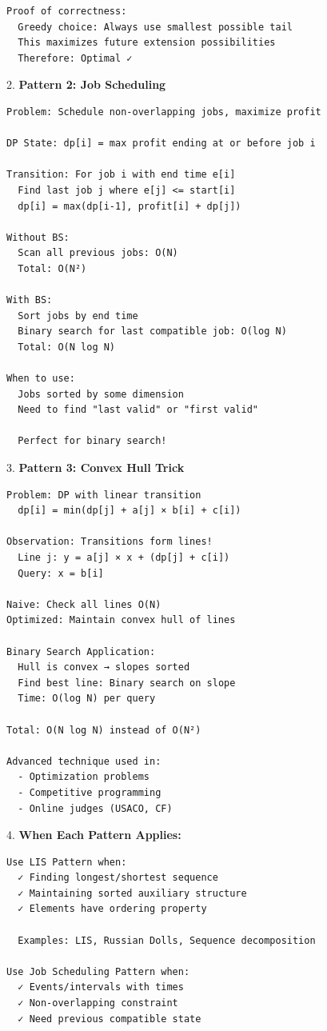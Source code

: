 \documentclass[11pt,a4paper,oneside]{book}
\begin{document}
\begin{tcolorbox}[
    enhanced,breakable,
    colback=white,
    colframe=deepblue,
    boxrule=1.5pt,
    arc=3mm,
    title=\textbf{The BS+DP Synergy}
]
\begin{verbatim}
Proof of correctness:
  Greedy choice: Always use smallest possible tail
  This maximizes future extension possibilities
  Therefore: Optimal ✓
\end{verbatim}

2. \textbf{Pattern 2: Job Scheduling}
\begin{verbatim}
Problem: Schedule non-overlapping jobs, maximize profit

DP State: dp[i] = max profit ending at or before job i

Transition: For job i with end time e[i]
  Find last job j where e[j] <= start[i]
  dp[i] = max(dp[i-1], profit[i] + dp[j])

Without BS:
  Scan all previous jobs: O(N)
  Total: O(N²)

With BS:
  Sort jobs by end time
  Binary search for last compatible job: O(log N)
  Total: O(N log N)

When to use:
  Jobs sorted by some dimension
  Need to find "last valid" or "first valid"
  
  Perfect for binary search!
\end{verbatim}

3. \textbf{Pattern 3: Convex Hull Trick}
\begin{verbatim}
Problem: DP with linear transition
  dp[i] = min(dp[j] + a[j] × b[i] + c[i])

Observation: Transitions form lines!
  Line j: y = a[j] × x + (dp[j] + c[i])
  Query: x = b[i]

Naive: Check all lines O(N)
Optimized: Maintain convex hull of lines
  
Binary Search Application:
  Hull is convex → slopes sorted
  Find best line: Binary search on slope
  Time: O(log N) per query

Total: O(N log N) instead of O(N²)

Advanced technique used in:
  - Optimization problems
  - Competitive programming
  - Online judges (USACO, CF)
\end{verbatim}

4. \textbf{When Each Pattern Applies:}
\begin{verbatim}
Use LIS Pattern when:
  ✓ Finding longest/shortest sequence
  ✓ Maintaining sorted auxiliary structure
  ✓ Elements have ordering property
  
  Examples: LIS, Russian Dolls, Sequence decomposition

Use Job Scheduling Pattern when:
  ✓ Events/intervals with times
  ✓ Non-overlapping constraint
  ✓ Need previous compatible state
  

\end{verbatim}
\end{tcolorbox}
\end{document}
